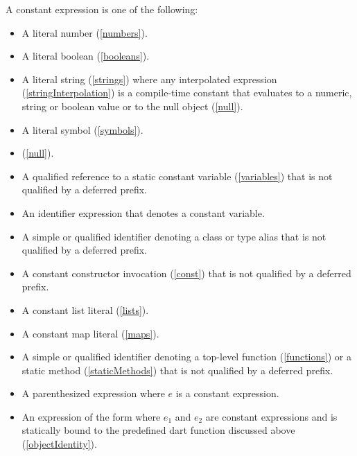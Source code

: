 \documentclass{article}
\begin{document}
\LMHash{}
A constant expression is one of the following:
\begin{itemize}
\item A literal number (\ref{numbers}).
\item A literal boolean (\ref{booleans}).
\item A literal string (\ref{strings}) where any interpolated expression (\ref{stringInterpolation}) is a compile-time constant that evaluates to a numeric, string or boolean value or to the null object (\ref{null}).
\item A literal symbol (\ref{symbols}).
\item \NULL{} (\ref{null}).
\item A qualified reference to a static constant variable (\ref{variables}) that is not qualified by a deferred prefix.
\item An identifier expression that denotes a constant variable.
\item A simple or qualified identifier denoting a class or type alias that is not qualified by a deferred prefix.
\item A constant constructor invocation (\ref{const}) that is not qualified by a deferred prefix.
\item A constant list literal (\ref{lists}).
\item A constant map literal (\ref{maps}).
\item A simple or qualified identifier denoting a top-level function (\ref{functions}) or a static method (\ref{staticMethods}) that is not qualified by a deferred prefix.
\item A parenthesized expression  where $e$ is a constant expression.
\item An expression of the form  where $e_1$ and $e_2$ are constant expressions and  is statically bound to the predefined dart function  discussed above (\ref{objectIdentity}).

\end{itemize}
\end{document}
